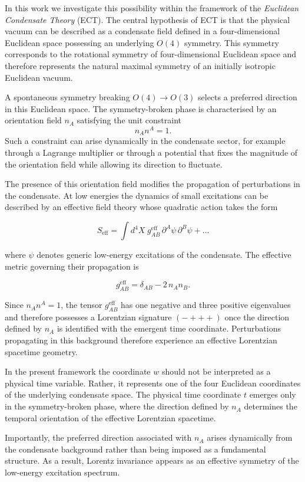 \documentclass[11pt,a4paper]{article}
\numberwithin{equation}{section}
\begin{document}
In this work we investigate this possibility within the framework of the
\emph{Euclidean Condensate Theory} (ECT). The central hypothesis of ECT
is that the physical vacuum can be described as a condensate field
defined in a four-dimensional Euclidean space possessing an underlying
$O(4)$ symmetry. This symmetry corresponds to the rotational symmetry
of four-dimensional Euclidean space and therefore represents the
natural maximal symmetry of an initially isotropic Euclidean vacuum.

A spontaneous symmetry breaking $O(4)\!\to\!O(3)$ selects a preferred direction in this Euclidean space. The symmetry-broken phase is characterised by an orientation field
$n_A$ satisfying the unit constraint
\[
n_A n^A = 1 .
\]
Such a constraint can arise dynamically in the condensate sector,
for example through a Lagrange multiplier or through a potential that
fixes the magnitude of the orientation field while allowing its
direction to fluctuate.

The presence of this orientation field modifies the propagation of
perturbations in the condensate. At low energies the dynamics of small
excitations can be described by an effective field theory whose
quadratic action takes the form

\[
S_{\mathrm{eff}}
=
\int d^4X \;
g^{\mathrm{eff}}_{AB}\,
\partial^A \psi \, \partial^B \psi
+ \dots
\]

where $\psi$ denotes generic low-energy excitations of the condensate.
The effective metric governing their propagation is

\[
g^{\mathrm{eff}}_{AB}
=
\delta_{AB}
-
2\, n_A n_B .
\]

Since $n_A n^A = 1$, the tensor $g^{\mathrm{eff}}_{AB}$ has one
negative and three positive eigenvalues and therefore possesses a
Lorentzian signature $(-+++)$ once the direction defined by $n_A$ is
identified with the emergent time coordinate. Perturbations propagating
in this background therefore experience an effective Lorentzian
spacetime geometry.

In the present framework the coordinate $w$ should not be interpreted
as a physical time variable. Rather, it represents one of the four
Euclidean coordinates of the underlying condensate space. The physical
time coordinate $t$ emerges only in the symmetry-broken phase, where
the direction defined by $n_A$ determines the temporal orientation of
the effective Lorentzian spacetime.

Importantly, the preferred direction associated with $n_A$ arises
dynamically from the condensate background rather than being imposed as
a fundamental structure. As a result, Lorentz invariance appears as an
effective symmetry of the low-energy excitation spectrum.
\end{document}
